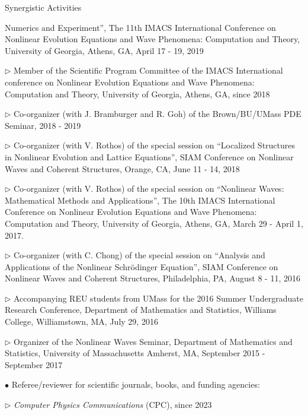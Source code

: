 \documentclass[10pt]{article} %
\newenvironment{outerlist}[1][\enskip\textbullet]%
        {\begin{itemize}[#1]}{\end{itemize}%
         \vspace{-.6\baselineskip}}
\newenvironment{innerlist}[1][\enskip\textbullet]%
        {\begin{compactitem}[#1]}{\end{compactitem}}
\begin{document}
\begin{section}{Synergistic Activities}
\begin{outerlist}
\begin{innerlist}
                        Numerics and Experiment'', The 11th IMACS International Conference on Nonlinear Evolution Equations and Wave Phenomena: 
                        Computation and Theory, University of Georgia, Athens, GA, April 17 - 19, 2019
\item[$\triangleright$] Member of the Scientific Program Committee of the IMACS International conference on Nonlinear Evolution Equations 
                        and Wave Phenomena: Computation and Theory, University of Georgia, Athens, GA, since 2018 
\item[$\triangleright$] Co-organizer (with J. Bramburger and R. Goh) of the Brown/BU/UMass PDE Seminar, 2018 - 2019
\item[$\triangleright$] Co-organizer (with V. Rothos) of the special session on ``Localized Structures in Nonlinear Evolution
                        and Lattice Equations'', SIAM Conference on Nonlinear Waves and Coherent Structures, Orange, CA, June 11 - 14, 2018
\item[$\triangleright$] Co-organizer (with V. Rothos) of the special session on ``Nonlinear Waves: Mathematical Methods and Applications'',
                        The 10th IMACS International Conference on Nonlinear Evolution Equations and Wave Phenomena: Computation and Theory, %
                        University of Georgia, Athens, GA, March 29 - April 1, 2017. 
\item[$\triangleright$] Co-organizer (with C. Chong) of the special session on ``Analysis and Applications of the Nonlinear Schr\"odinger Equation'', 
                        SIAM Conference on Nonlinear Waves and Coherent Structures, Philadelphia, PA, August 8 - 11, 2016
\item[$\triangleright$] Accompanying REU students from UMass for the 2016 Summer Undergraduate Research Conference, Department of Mathematics 
                        and Statistics, Williams College, Williamstown, MA, July 29, 2016      
\item[$\triangleright$] Organizer of the Nonlinear Waves Seminar, Department of Mathematics and Statistics, University of Massachusetts Amherst, 
                        MA, September 2015 - September 2017 
\end{innerlist} 
\item[$\bullet$] Referee/reviewer for scientific journals, books, and funding agencies:
\begin{innerlist}
\item[$\triangleright$] \textit{Computer Physics Communications} (CPC), since 2023

\end{innerlist}
\end{outerlist}
\end{section}
\end{document}
